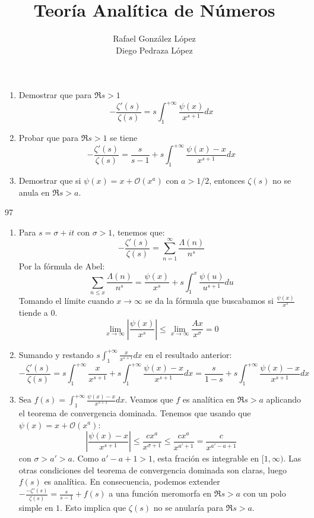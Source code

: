 \documentclass[twoside]{article}
\begin{document}
\title{Teoría Analítica de Números}
\author{Rafael González López\\Diego Pedraza López}
\maketitle

\begin{ejercicio}{1}
\begin{enumerate}
	\item Demostrar que para $\Re s > 1$
	\[ -\frac{ζ'(s)}{ζ(s)} = s \int_1^{+∞} \frac{ψ(x)}{x^{s+1}} dx \]
	\item Probar que para $\Re s > 1$ se tiene
	\[ -\frac{ζ'(s)}{ζ(s)} = \frac{s}{s-1} + s \int_1^{+∞} \frac{ψ(x)-x}{x^{s+1}}dx \]
	\item Demostrar que si $ψ(x) = x + \mathcal{O}(x^a)$ con $a > 1/2$, entonces $ζ(s)$ no se anula en $\Re s > a$.
\end{enumerate}97
\end{ejercicio}
\begin{solucion}
\begin{enumerate}
	\item Para $s=σ+it$ con $σ>1$, tenemos que:
\[ - \frac{ζ'(s)}{ζ(s)} = \sum_{n=1}^{∞} \frac{Λ(n)}{n^s} \]
Por la fórmula de Abel:
\[ \sum_{n≤x} \frac{Λ(n)}{n^s} = \frac{ψ(x)}{x^s} + s \int_1^{x} \frac{ψ(u)}{u^{s+1}} du \]
Tomando el límite cuando $x\to∞$ se da la fórmula que buscabamos si $\frac{ψ(x)}{x^s}$ tiende a $0$.
\[ \lim_{x \to ∞} \left|\frac{ψ(x)}{x^s}\right| ≤ \lim_{x \to ∞} \frac{Ax}{x^σ} = 0\]
	\item Sumando y restando $s\int_1^{+∞} \frac{x}{x^{s+1}}dx$ en el resultado anterior:
	\[ -\frac{ζ'(s)}{ζ(s)} = s\int_1^{+∞} \frac{x}{x^{s+1}} + s \int_1^{+∞} \frac{ψ(x)-x}{x^{s+1}} dx = \frac{s}{1-s} + s \int_1^{+∞} \frac{ψ(x)-x}{x^{s+1}} dx \]
	\item Sea $f(s) = \int_1^{+∞} \frac{ψ(x)-x}{x^{s+1}} dx$. Veamos que $f$ es analítica en $\Re s > a$ aplicando el teorema de convergencia dominada. Tenemos que usando que $ψ(x) = x+\mathcal{O}(x^a)$:
	\[ \left|\frac{ψ(x)-x}{x^{s+1}}\right| ≤ \frac{cx^a}{x^{σ+1}} ≤ \frac{cx^a}{x^{a'+1}} = \frac{c}{x^{a'-a+1}} \]
	con $σ > a' > a$. Como $a'-a+1 > 1$, esta fración es integrable en $[1,∞)$. Las otras condiciones del teorema de convergencia dominada son claras, luego $f(s)$ es analítica. En consecuencia, podemos extender $-\frac{-ζ'(s)}{ζ(s)} = \frac{s}{s-1}+f(s)$ a una función meromorfa en $\Re s > a$ con un polo simple en $1$.
	Esto implica que $ζ(s)$ no se anularía para $\Re s > a$.
\end{enumerate}
\end{solucion}
\end{document}
